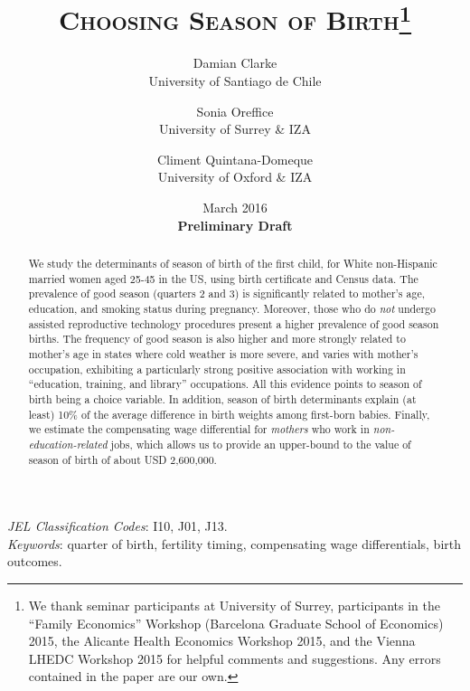 \documentclass[a4paper, 11.5 pt]{article}
\theoremstyle{plain}
\begin{document}
\title{\Large{\textsc{Choosing Season of Birth}}\thanks{\scriptsize{We thank seminar participants at University of Surrey, participants in the ``Family Economics'' Workshop (Barcelona Graduate School of Economics) 2015, the Alicante Health Economics Workshop 2015, and the Vienna LHEDC Workshop 2015 for helpful comments and suggestions. Any errors contained in the paper are our own.}}}
\author{\small{Damian Clarke} \\ \small{University of Santiago de Chile} \and \small{Sonia Oreffice} \\ \small{University of Surrey \& IZA}  \and \small{Climent Quintana-Domeque} \\ \small{University of Oxford \& IZA}}

\date{{\small March 2016} \\ \vspace{2mm} \small{\textbf{Preliminary Draft}}}




\maketitle
\thispagestyle{empty}

\begin{abstract}
We study the determinants of season of birth of the first child, for White non-Hispanic married women aged 25-45 in the US, using birth certificate and Census data. The prevalence of good season (quarters 2 and 3) is significantly related to mother's age, education, and smoking status during pregnancy. Moreover, those who do \emph{not} undergo assisted reproductive technology procedures present a higher prevalence of good season births. The frequency of good season is also higher and more strongly related to mother's age in states where cold weather is more severe, and varies with mother's occupation, exhibiting a particularly strong positive association with working in ``education, training, and library'' occupations. All this evidence points to season of birth being a choice variable. In addition, season of birth determinants explain (at least) 10\% of the average difference in birth weights among first-born babies. Finally, we estimate the compensating wage differential for \emph{mothers} who work in \emph{non-education-related} jobs, which allows us to provide an upper-bound to the value of season of birth of about USD 2,600,000.
\end{abstract}
\emph{JEL Classification Codes}: I10, J01, J13.\\
\emph{Keywords}: quarter of birth, fertility timing, compensating wage differentials, birth outcomes.
\end{document}
